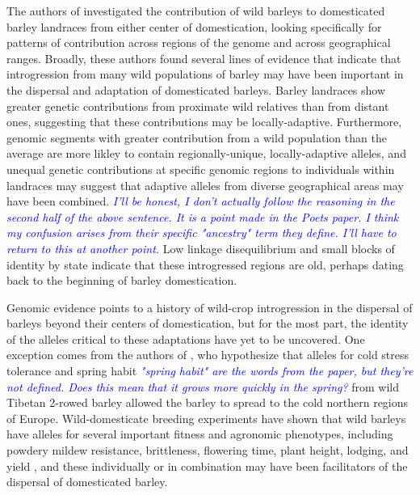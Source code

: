 \documentclass[11pt]{article}
\newcommand{\gmj}[1]{\textcolor{blue}{ \emph{\scriptsize  #1}} } %
\begin{document}
\begin{enumerate}

The authors of \cite{Poets2015} investigated the contribution of wild barleys to domesticated barley landraces from either center of domestication, looking specifically for patterns of contribution across regions of the genome and across geographical ranges.
Broadly, these authors found several lines of evidence that indicate that introgression from many wild populations of barley may have been important in the dispersal and adaptation of domesticated barleys.
Barley landraces show greater genetic contributions from proximate wild relatives than from distant ones, suggesting that these contributions may be locally-adaptive.
Furthermore, genomic segments with greater contribution from a wild population than the average are more likley to contain regionally-unique, locally-adaptive alleles, and unequal genetic contributions at specific genomic regions to individuals within landraces may suggest that adaptive alleles from diverse geographical areas may have been combined.
\gmj{I'll be honest, I don't actually follow the reasoning in the second half of the above sentence.  It is a point made in the Poets paper.  I think my confusion arises from their specific "ancestry" term they define.  I'll have to return to this at another point.}
Low linkage disequilibrium and small blocks of identity by state indicate that these introgressed regions are old, perhaps dating back to the beginning of barley domestication.

Genomic evidence points to a history of wild-crop introgression in the dispersal of barleys beyond their centers of domestication, but for the most part, the identity of the alleles critical to these adaptations have yet to be uncovered.
One exception comes from the authors of \cite{dai2012tibet}, who hypothesize that alleles for cold stress tolerance and spring habit \gmj{"spring habit" are the words from the paper, but they're not defined.  Does this mean that it grows more quickly in the spring?} from wild Tibetan 2-rowed barley allowed the barley to spread to the cold northern regions of Europe.
Wild-domesticate breeding experiments have shown that wild barleys have alleles for several important fitness and agronomic phenotypes, including powdery mildew resistance, brittleness, flowering time, plant height, lodging, and yield \cite{dreiseitl2017heterogeneity,von2006ab,handley1994chromosome}, and these individually or in combination may have been facilitators of the dispersal of domesticated barley.









\end{enumerate}
\end{document}
